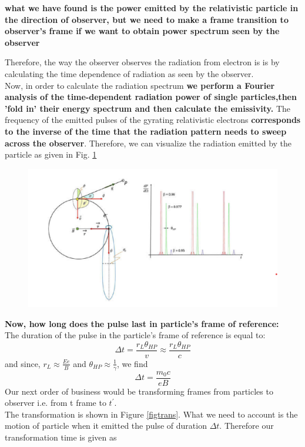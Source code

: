 \documentclass[12pt]{report}
\newcommand{\cbox}{tcolorbox}
\begin{document}
\begin{\cbox}
\textbf{what we have found is the power emitted by the relativistic particle in the direction of observer, but we need to make a frame transition to observer's frame if we want to obtain power spectrum seen by the observer}
\end{\cbox}
Therefore, the way the observer observes the radiation from electron is is by calculating the time dependence of radiation as seen by the observer.\\
Now, in order to calculate the radiation spectrum \textbf{ we perform a Fourier analysis of the time-dependent radiation power of single particles,then 'fold in' their energy spectrum and then calculate the emissivity.} The frequency of the emitted pulses of the gyrating relativistic electrons \textbf{ corresponds to the inverse of the time that the radiation pattern needs to sweep across the observer}.
Therefore, we can visualize the radiation emitted by the particle as given in Fig. \ref{figobsrad}
\begin{figure}\label{figobsrad}
\includegraphics[scale=1]{figobsrad.png}
\end{figure}
\textbf{Now, how long does the pulse last in particle's frame of reference:}\\
The duration of the pulse in the particle's frame of reference is equal to:
\begin{equation}
\Delta t =\frac{r_L\theta_{HP}}{v}\approx \frac{r_L \theta_{HP}}{c}
\end{equation}
and since, $r_L \approx \frac{Ee}{B}$ and $\theta_{HP}\approx \frac{1}{\gamma}$, we find 
\begin{equation}
\Delta t =\frac{m_0 c}{e B}
\end{equation}
Our next order of business would be transforming frames from particles to observer i.e. from t frame to $t^\prime$.\\
The transformation is shown in Figure \ref{figtrans}. What we need to account is the motion of particle when it emitted the pulse of duration $\Delta t$. Therefore our transformation time is given as 
\end{document}
